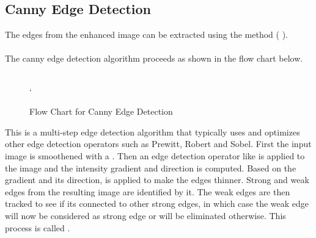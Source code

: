 \subsection{Canny Edge Detection}

The edges from the enhanced image can be extracted using the  method (\cite{Reference7} ). 
\\
\\
The canny edge detection algorithm proceeds as shown in the flow chart below.
\\
\\
	\begin{center}
	\begin{figure}[hbt]
	\centering

	\caption{Flow Chart for Canny Edge Detection}
`   \label{fig:CannyEdgeDetectionFlowChart}

\end{figure}
\end{center}


This is a multi-step edge detection algorithm that typically uses and optimizes other edge detection operators such as Prewitt, Robert and Sobel. First the input image is smoothened with a . Then an edge detection operator like  is applied to the image and the intensity gradient and direction is computed. Based on the gradient and its direction,  is applied to make the edges thinner. Strong and weak edges from the resulting image are identified by  it. The weak edges are then tracked to see if its connected to other strong edges, in which case the weak edge will now be considered as strong edge or will be eliminated otherwise. This process is called .

